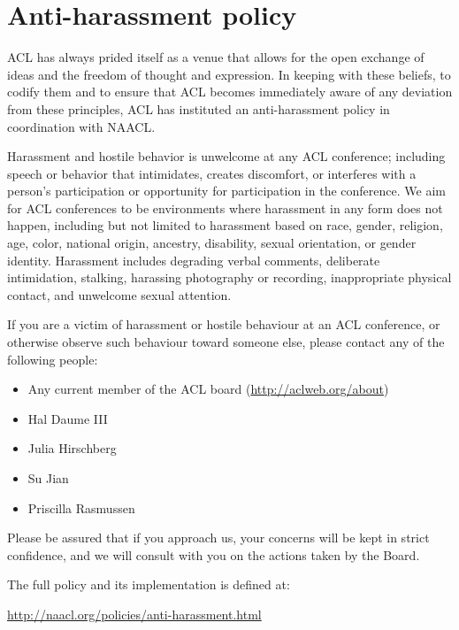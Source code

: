 \chapter[Anti-harassment policy]{Anti-harassment policy}
\thispagestyle{emptyheader}
\setheaders{}{}

ACL has always prided itself as a venue that allows for the open
exchange of ideas and the freedom of thought and expression. In
keeping with these beliefs, to codify them and to ensure that ACL
becomes immediately aware of any deviation from these principles, ACL
has instituted an anti-harassment policy in coordination with NAACL.

Harassment and hostile behavior is unwelcome at any ACL conference;
including speech or behavior that intimidates, creates discomfort, or
interferes with a person's participation or opportunity for
participation in the conference. We aim for ACL conferences to be
environments where harassment in any form does not happen, including
but not limited to harassment based on race, gender, religion, age,
color, national origin, ancestry, disability, sexual orientation, or
gender identity. Harassment includes degrading verbal comments,
deliberate intimidation, stalking, harassing photography or recording,
inappropriate physical contact, and unwelcome sexual attention.

If you are a victim of harassment or hostile behaviour at an ACL
conference, or otherwise observe such behaviour toward someone else,
please contact any of the following people:

\begin{itemize}
\item Any current member of the ACL board (\url{http://aclweb.org/about})
\item Hal Daume III 
\item Julia Hirschberg 
\item Su Jian 
\item Priscilla Rasmussen 
\end{itemize}

Please be assured that if you approach us, your concerns will be kept
in strict confidence, and we will consult with you on the actions
taken by the Board.

The full policy and its implementation is defined at:

\url{http://naacl.org/policies/anti-harassment.html}
